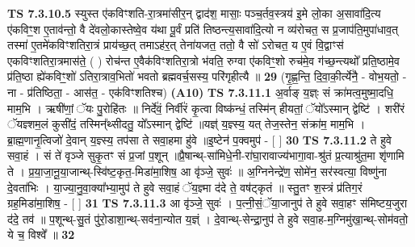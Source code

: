 \documentclass[17pt]{extarticle}
\begin{document}
                  \newline
                                \textbf{ TS 7.3.10.5} \newline
                  स्युस्त ए॑कविꣳशति-रा॒त्रमा॑सीर॒न् द्वाद॑श॒ मासाः॒ पञ्च॒र्तव॒स्त्रय॑ इ॒मे लो॒का अ॒सावा॑दि॒त्य ए॑कविꣳ॒॒श ए॒ताव॑न्तो॒ वै दे॑वलो॒कास्तेष्वे॒व य॑था पू॒र्वं प्रति॑ तिष्ठन्त्य॒सावा॑दि॒त्यो न व्य॑रोचत॒ स प्र॒जाप॑ति॒मुपा॑धाव॒त् तस्मा॑ ए॒तमे॑कविꣳशतिरा॒त्रं प्राय॑च्छ॒त् तमाऽह॑र॒त् तेना॑यजत॒ ततो॒ वै सो॑ ऽरोचत॒ य ए॒वं वि॒द्वाꣳस॑ एकविꣳशतिरा॒त्रमास॑ते॒ ( ) रोच॑न्त ए॒वैक॑विꣳशतिरा॒त्रो भ॑वति॒ रुग्वा ए॑कविꣳ॒॒शो रुच॑मे॒व ग॑च्छ॒न्त्यथो᳚ प्रति॒ष्ठामे॒व प्र॑ति॒ष्ठा ह्ये॑कविꣳ॒॒शो॑ ऽतिरा॒त्राव॒भितो॑ भवतो ब्रह्मवर्च॒सस्य॒ परि॑गृहीत्यै ॥ \textbf{  29} \newline
                  \newline
                      (गृ॒ह्ण॒न्ति॒ दि॒वा॒की॒र्त्ये॑नै॒ - वोभ॒यतो॒ - ना - प्र॑तिष्ठिता॒ - आस॑त॒ - एक॑विꣳशतिश्च)  \textbf{(A10)} \newline \newline
                                        \textbf{ TS 7.3.11.1} \newline
                  अ॒र्वाङ् य॒ज्ञ्ः सं क्रा॑मत्व॒मुष्मा॒दधि॒ माम॒भि । ऋषी॑णां॒ ॅयः पु॒रोहि॑तः ॥ निर्दे॑वं॒ निर्वी॑रं कृ॒त्वा विष्क॑न्धं॒ तस्मि॑न् हीयतां॒ ॅयो᳚ऽस्मान् द्वेष्टि॑ । शरी॑रं ॅयज्ञ्शम॒लं कुसी॑दं॒ तस्मिन्᳚थ्सीदतु॒ यो᳚ऽस्मान् द्वेष्टि॑ ॥यज्ञ्॑ य॒ज्ञ्स्य॒ यत् तेज॒स्तेन॒ संक्रा॑म॒ माम॒भि । ब्रा॒ह्म॒णानृ॒त्विजो॑ दे॒वान् य॒ज्ञ्स्य॒ तप॑सा ते सवा॒हमा हु॑वे ॥इ॒ष्टेन॑ प॒क्वमुप॑ - [  ] \textbf{  30} \newline
                  \newline
                                \textbf{ TS 7.3.11.2} \newline
                  ते हुवे सवा॒हं । सं ते॑ वृञ्जे सुकृ॒तꣳ सं प्र॒जां प॒शून् ॥प्रै॒षान्थ्-सा॑मिधे॒नी-रा॑घा॒रावाज्य॑भागा॒वा-श्रु॑तं प्र॒त्याश्रु॑त॒मा शृ॑णामि ते । प्र॒या॒जा॒नू॒या॒जान्थ्-स्वि॑ष्ट॒कृत॒-मिडा॑मा॒शिष॒ आ वृ॑ञ्जे॒ सुवः॑ ॥ अ॒ग्निनेन्द्रे॑ण॒ सोमे॑न॒ सर॑स्वत्या॒ विष्णु॑ना दे॒वता॑भिः । या॒ज्या॒नु॒वा॒क्या᳚भ्या॒मुप॑ ते हुवे सवा॒हं ॅय॒ज्ञ्मा द॑दे ते॒ वष॑ट्कृतं ॥ स्तु॒तꣳ श॒स्त्रं प्र॑तिग॒रं ग्रह॒मिडा॑मा॒शिष॒ - [  ] \textbf{  31} \newline
                  \newline
                                \textbf{ TS 7.3.11.3} \newline
                  आ वृ॑ञ्जे॒ सुवः॑ । प॒त्नी॒सं॒ॅया॒जानुप॑ ते हुवे सवा॒हꣳ स॑मिष्टय॒जुरा द॑दे॒ तव॑ ॥ प॒शून्थ्-सु॒तं पु॑रो॒डाशा॒न्थ्-सव॑ना॒न्योत य॒ज्ञ्ं । दे॒वान्थ्-सेन्द्रा॒नुप॑ ते हुवे सवा॒ह-म॒ग्निमु॑खा॒न्थ्-सोम॑वतो॒ ये च॒ विश्वे᳚ ॥ \textbf{  32 } \newline
\end{document}
